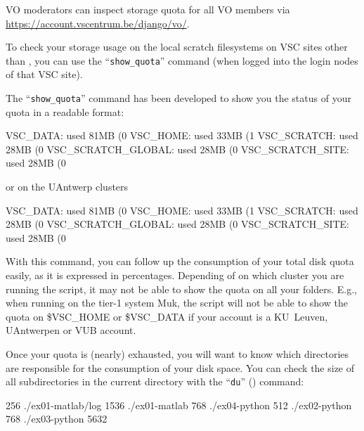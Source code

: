VO moderators can inspect storage quota for all VO members via\\
\url{https://account.vscentrum.be/django/vo/}.

To check your storage usage on the local scratch filesystems on VSC sites other than \university,
you can use the ``\texttt{show\_quota}'' command (when logged into the login nodes of that VSC site).

\else  %

The ``\texttt{show\_quota}'' command has been developed to show you the
status of your quota in a readable format:

\begin{prompt}
VSC_DATA:    used 81MB (0%
VSC_HOME:    used 33MB (1%
VSC_SCRATCH:   used 28MB (0%
VSC_SCRATCH_GLOBAL: used 28MB (0%
VSC_SCRATCH_SITE:   used 28MB (0%
\end{prompt}

or on the UAntwerp clusters

\begin{prompt}
VSC_DATA:    used 81MB (0%
VSC_HOME:    used 33MB (1%
VSC_SCRATCH:   used 28MB (0%
VSC_SCRATCH_GLOBAL: used 28MB (0%
VSC_SCRATCH_SITE:   used 28MB (0%
\end{prompt}


With this command, you can follow up the consumption of your total disk quota
easily, as it is expressed in percentages. Depending of on which cluster you are
running the script, it may not be able to show the quota on all your folders.
E.g., when running on the tier-1 system Muk, the script will not be able to show
the quota on \$VSC\_HOME or \$VSC\_DATA if your account is a KU~Leuven, UAntwerpen or VUB account.

\fi  %

Once your quota is (nearly) exhausted, you will want to know which directories
are responsible for the consumption of your disk space. You can check the size
of all subdirectories in the current directory with the ``\texttt{du}'' () command:

\begin{prompt}
256 ./ex01-matlab/log
1536 ./ex01-matlab
768 ./ex04-python
512 ./ex02-python
768 ./ex03-python
5632
\end{prompt}

